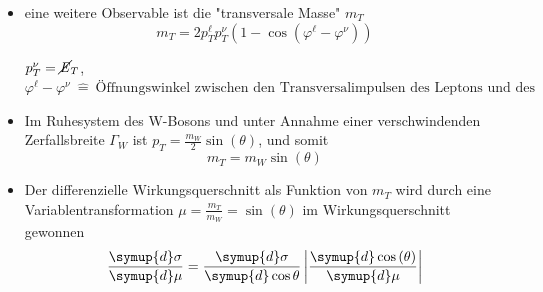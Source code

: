 \documentclass[aspectratio=1610, 9pt]{beamer}
\begin{document}
\begin{frame}
  \begin{itemize}
    \item eine weitere Observable ist die "transversale Masse" $m_T$
    \begin{equation*}
      m_T = 2 p^\ell_T p^\nu_T \left(1 - \cos{\left(\varphi^\ell-\varphi^\nu \right)} \right)
    \end{equation*}
    \begin{center}
      \small{$p^\nu_T = \cancel{\it{E}}_{T}$, $\varphi^\ell-\varphi^\nu \: \hat{=} \: \text{Öffnungswinkel zwischen den Transversalimpulsen des Leptons und des Neutrinos}$}
    \end{center}
    \item Im Ruhesystem des W-Bosons und unter Annahme einer verschwindenden Zerfallsbreite $\Gamma_W$ ist $p_T = \frac{m_W}{2} \sin{(\theta)}$, und somit
    \begin{equation*}
      m_T = m_W \sin{(\theta)}
    \end{equation*}
    \item Der differenzielle Wirkungsquerschnitt als Funktion von $m_T$ wird durch eine Variablentransformation $\mu = \frac{m_T}{m_W} = \sin{(\theta)}$ im Wirkungsquerschnitt gewonnen
    \begin{equation*}
      \frac{\symup{d}\sigma}{\symup{d}\mu} = \frac{\symup{d} \sigma}{\symup{d} \cos{\theta}} \left| \frac{\symup{d} \cos{(\theta)}}{\symup{d} \mu} \right|
    \end{equation*}
  \end{itemize}
\end{frame}
\end{document}
